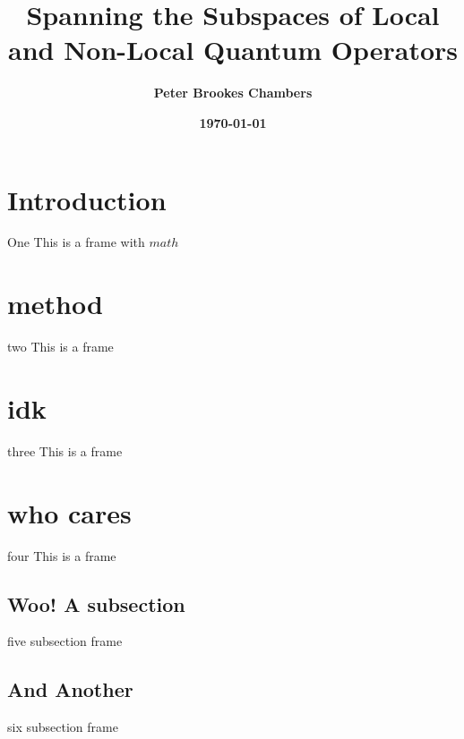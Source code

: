\documentclass[xcolor=table]{beamer}
\title[PHY8036 - Extended Project]{Spanning the Subspaces of Local and Non-Local Quantum Operators}
\author{\textbf{Peter Brookes Chambers}}
\date{\textbf{\today}}
\numberwithin{equation}{section}
\begin{document}
\begin{frame}
    \titlepage
\end{frame}

\section{Introduction}
    \begin{frame}{One}
        This is a frame with $math$
    \end{frame}

\section{method}
    \begin{frame}{two}
        This is a frame
    \end{frame}

\section{idk}
    \begin{frame}{three}
        This is a frame
    \end{frame}

\section{who cares}
    \begin{frame}{four}
        This is a frame
    \end{frame}

    \subsection{Woo! A subsection}
    \begin{frame}{five}
        subsection frame
    \end{frame}

    \subsection{And Another}
    \begin{frame}{six}
        subsection frame
    \end{frame}
\end{document}

